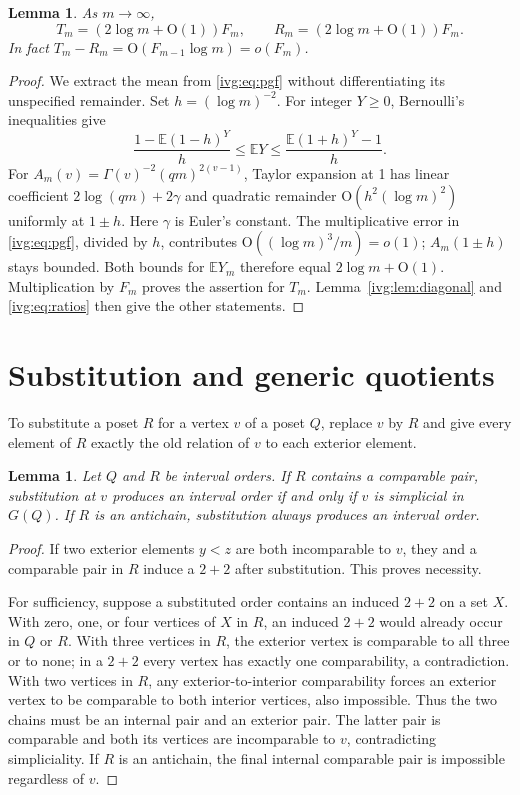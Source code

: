 \documentclass[11pt,letterpaper]{article}
\newtheorem{lemma}[theorem]{Lemma}
\theoremstyle{definition}\newtheorem{definition}[theorem]{Definition}
\theoremstyle{remark}\newtheorem{remark}[theorem]{Remark}
\newcommand{\OO}{\mathrm O}
\newcommand{\E}{\mathbb E}
\begin{document}
\begin{lemma}\label{ivg:lem:roots}
As $m\to\infty$,
\begin{equation}\label{ivg:eq:rootasym}
 T_m=(2\log m+\OO(1))F_m,\qquad
 R_m=(2\log m+\OO(1))F_m.
\end{equation}
In fact $T_m-R_m=\OO(F_{m-1}\log m)=o(F_m)$.
\end{lemma}
\begin{proof}
We extract the mean from \eqref{ivg:eq:pgf} without differentiating its unspecified remainder. Set $h=(\log m)^{-2}$. For integer $Y\ge0$, Bernoulli's inequalities give
\[
 \frac{1-\E(1-h)^Y}{h}\le\E Y\le
 \frac{\E(1+h)^Y-1}{h}.
\]
For $A_m(v)=\Gamma(v)^{-2}(qm)^{2(v-1)}$, Taylor expansion at 1 has linear coefficient $2\log(qm)+2\gamma$ and quadratic remainder $\OO(h^2(\log m)^2)$ uniformly at $1\pm h$. Here $\gamma$ is Euler's constant. The multiplicative error in \eqref{ivg:eq:pgf}, divided by $h$, contributes $\OO((\log m)^3/m)=o(1)$; $A_m(1\pm h)$ stays bounded. Both bounds for $\E Y_m$ therefore equal $2\log m+\OO(1)$. Multiplication by $F_m$ proves the assertion for $T_m$. Lemma~\ref{ivg:lem:diagonal} and \eqref{ivg:eq:ratios} then give the other statements.
\end{proof}

\section{Substitution and generic quotients}\label{ivg:sec:generic}
To substitute a poset $R$ for a vertex $v$ of a poset $Q$, replace $v$ by $R$ and give every element of $R$ exactly the old relation of $v$ to each exterior element.

\begin{lemma}\label{ivg:lem:substitution}
Let $Q$ and $R$ be interval orders. If $R$ contains a comparable pair, substitution at $v$ produces an interval order if and only if $v$ is simplicial in $G(Q)$. If $R$ is an antichain, substitution always produces an interval order.
\end{lemma}
\begin{proof}
If two exterior elements $y<z$ are both incomparable to $v$, they and a comparable pair in $R$ induce a $2+2$ after substitution. This proves necessity.

For sufficiency, suppose a substituted order contains an induced $2+2$ on a set $X$. With zero, one, or four vertices of $X$ in $R$, an induced $2+2$ would already occur in $Q$ or $R$. With three vertices in $R$, the exterior vertex is comparable to all three or to none; in a $2+2$ every vertex has exactly one comparability, a contradiction. With two vertices in $R$, any exterior-to-interior comparability forces an exterior vertex to be comparable to both interior vertices, also impossible. Thus the two chains must be an internal pair and an exterior pair. The latter pair is comparable and both its vertices are incomparable to $v$, contradicting simpliciality. If $R$ is an antichain, the final internal comparable pair is impossible regardless of $v$.
\end{proof}
\end{document}
